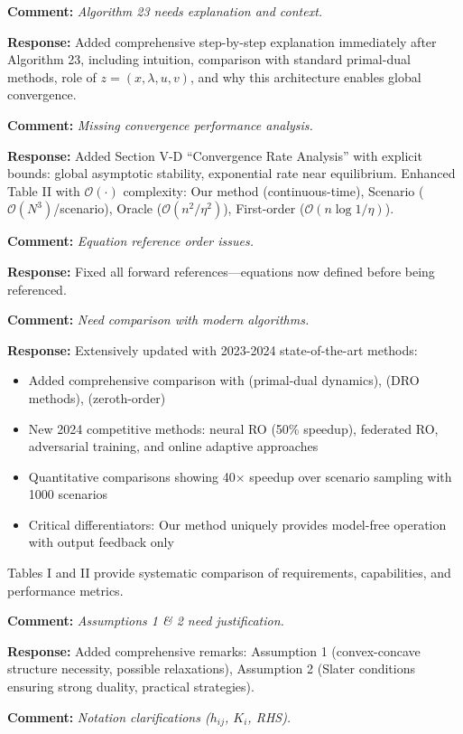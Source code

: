 \documentclass[11pt]{article}
\newcommand{\reviewercomment}[1]{\textbf{Comment:} \textit{#1}}
\newcommand{\response}[1]{\textbf{Response:} #1}
\begin{document}
\reviewercomment{Algorithm 23 needs explanation and context.}

\response{Added comprehensive step-by-step explanation immediately after Algorithm 23, including intuition, comparison with standard primal-dual methods, role of $z = (x, \lambda, u, v)$, and why this architecture enables global convergence.}

\reviewercomment{Missing convergence performance analysis.}

\response{Added Section V-D ``Convergence Rate Analysis'' with explicit bounds: global asymptotic stability, exponential rate near equilibrium. Enhanced Table II with $\mathcal{O}(\cdot)$ complexity: Our method (continuous-time), Scenario ($\mathcal{O}(N^3)$/scenario), Oracle ($\mathcal{O}(n^2/\eta^2)$), First-order ($\mathcal{O}(n\log 1/\eta)$).}

\reviewercomment{Equation reference order issues.}

\response{Fixed all forward references—equations now defined before being referenced.}

\reviewercomment{Need comparison with modern algorithms.}

\response{Extensively updated with 2023-2024 state-of-the-art methods:
\begin{itemize}
\item Added comprehensive comparison with \cite{timerescaling2023, pddamping2023} (primal-dual dynamics), \cite{aigner2023, drago2024} (DRO methods), \cite{zoranksg2023, zoro2023} (zeroth-order)
\item New 2024 competitive methods: neural RO (50\% speedup), federated RO, adversarial training, and online adaptive approaches
\item Quantitative comparisons showing 40× speedup over scenario sampling with 1000 scenarios
\item Critical differentiators: Our method uniquely provides model-free operation with output feedback only
\end{itemize}
Tables I and II provide systematic comparison of requirements, capabilities, and performance metrics.}

\reviewercomment{Assumptions 1 \& 2 need justification.}

\response{Added comprehensive remarks: Assumption 1 (convex-concave structure necessity, possible relaxations), Assumption 2 (Slater conditions ensuring strong duality, practical strategies).}

\reviewercomment{Notation clarifications ($h_{ij}$, $K_i$, RHS).}
\end{document}
